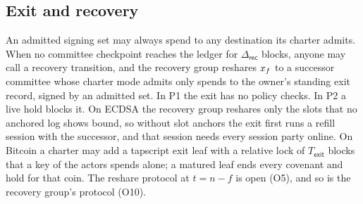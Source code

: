 \subsection{Exit and recovery}\label{sec:exit}

An admitted signing set may always spend to any destination its charter admits. When no committee checkpoint reaches the ledger for $\Delta_{\mathsf{rec}}$ blocks, anyone may call a recovery transition, and the recovery group reshares $x_{f}$ to a successor committee whose charter mode admits only spends to the owner's standing exit record, signed by an admitted set. In P1 the exit has no policy checks. In P2 a live hold blocks it. On ECDSA the recovery group reshares only the slots that no anchored log shows bound, so without slot anchors the exit first runs a refill session with the successor, and that session needs every session party online. On Bitcoin a charter may add a tapscript exit leaf with a relative lock of $T_{\mathsf{exit}}$ blocks that a key of the actors spends alone; a matured leaf ends every covenant and hold for that coin. The reshare protocol at $t = n - f$ is open (O5), and so is the recovery group's protocol (O10).
